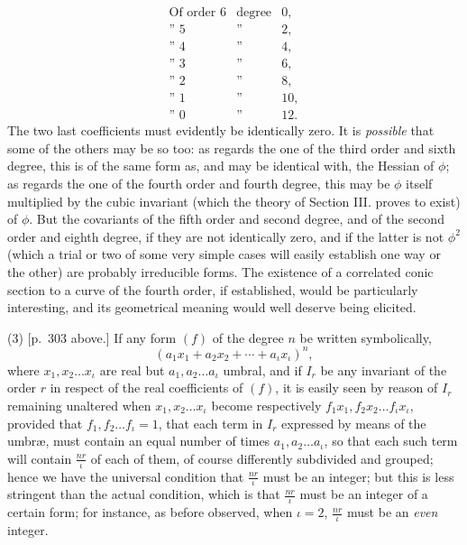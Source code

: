 \documentclass[11pt]{article}
\newcommand{\sourcepage}[1]{\marginpar{\scriptsize p.~#1}}
\begin{document}
{{\sourcepage{323}
\[
\begin{array}{ccc}
\text{Of order }6&\text{degree}&0,\\
\text{'' }5&\text{''}&2,\\
\text{'' }4&\text{''}&4,\\
\text{'' }3&\text{''}&6,\\
\text{'' }2&\text{''}&8,\\
\text{'' }1&\text{''}&10,\\
\text{'' }0&\text{''}&12.
\end{array}
\]
The two last coefficients must evidently be identically zero. It is \emph{possible} that some of the others may be so too: as regards the one of the third order and sixth degree, this is of the same form as, and may be identical with, the Hessian of $\phi$; as regards the one of the fourth order and fourth degree, this may be $\phi$ itself multiplied by the cubic invariant (which the theory of Section III. proves to exist) of $\phi$. But the covariants of the fifth order and second degree, and of the second order and eighth degree, if they are not identically zero, and if the latter is not $\phi^2$ (which a trial or two of some very simple cases will easily establish one way or the other) are probably irreducible forms. The existence of a correlated conic section to a curve of the fourth order, if established, would be particularly interesting, and its geometrical meaning would well deserve being elicited.

(3) [p.~303 above.] If any form $(f)$ of the degree $n$ be written symbolically,
\[
(a_1x_1+a_2x_2+\cdots+a_\iota x_\iota)^n,
\]
where $x_1,x_2\ldots x_\iota$ are real but $a_1,a_2\ldots a_\iota$ umbral, and if $I_r$ be any invariant of the order $r$ in respect of the real coefficients of $(f)$, it is easily seen by reason of $I_r$ remaining unaltered when $x_1,x_2\ldots x_\iota$ become respectively $f_1x_1,f_2x_2\ldots f_\iota x_\iota$, provided that $f_1,f_2\ldots f_\iota=1$, that each term in $I_r$ expressed by means of the umbræ, must contain an equal number of times $a_1,a_2\ldots a_\iota$, so that each such term will contain $\frac{nr}{\iota}$ of each of them, of course differently subdivided and grouped; hence we have the universal condition that $\frac{nr}{\iota}$ must be an integer; but this is less stringent than the actual condition, which is that $\frac{nr}{\iota}$ must be an integer of a certain form; for instance, as before observed, when $\iota=2$, $\frac{nr}{\iota}$ must be an \emph{even} integer.

}}
\end{document}
